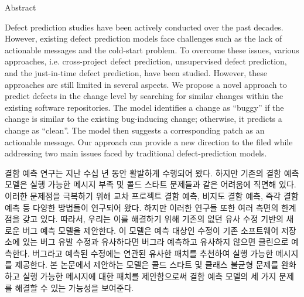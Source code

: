 
\newcommand{\abstractEN}[1]{\normalsize #1 \par}
\newcommand{\abstractKR}[1]{\normalsize #1 \par}

\fontsize{14}{18} \selectfont Abstract \par
{}

\bigskip
\abstractEN{
    Defect prediction studies have been actively conducted over the past decades.
    However, existing defect prediction models face challenges such as the lack of actionable messages and the cold-start problem.
    To overcome these issues, various approaches, i.e. cross-project defect prediction, unsupervised defect prediction, and the just-in-time defect prediction, have been studied.
    However, these approaches are still limited in several aspects.
    We propose a novel approach to predict defects in the change level by searching for similar changes within the existing software repositories.
    The model identifies a change as ``buggy'' if the change is similar to the existing bug-inducing change; otherwise, it predicts a change as ``clean''.
    The model then suggests a corresponding patch as an actionable message.
    Our approach can provide a new direction to the filed while addressing two main issues faced by traditional defect-prediction models.
}
\bigskip
\bigskip
\abstractKR{
    결함 예측 연구는 지난 수십 년 동안 활발하게 수행되어 왔다.
    하지만 기존의 결함 예측 모델은 실행 가능한 메시지 부족 및 콜드 스타트 문제들과 같은 어려움에 직면해 있다.
    이러한 문제점을 극복하기 위해 교차 프로젝트 결함 예측, 비지도 결함 예측, 즉각 결함 예측 등 다양한 방법들이 연구되어 왔다.
    하지만 이러한 연구들 또한 여러 측면의 한계점을 갖고 있다.
    따라서, 우리는 이를 해결하기 위해 기존의 없던 유사 수정 기반의 새로운 버그 예측 모델을 제안한다.
    이 모델은 예측 대상인 수정이 기존 소프트웨어 저장소에 있는 버그 유발 수정과 유사하다면 버그라 예측하고 유사하지 않으면 클린으로 예측한다.
    버그라고 예측된 수정에는 연관된 유사한 패치를 추천하여 실행 가능한 메시지를 제공한다.
    본 논문에서 제안하는 모델은 콜드 스타트 및 클래스 불균형 문제를 완화하고 실행 가능한 메시지에 대한 패치를 제안함으로써 결함 예측 모델의 세 가지 문제를 해결할 수 있는 가능성을 보여준다.
}

\clearpage
